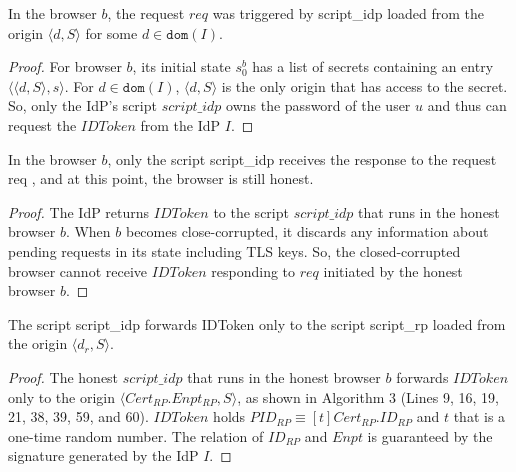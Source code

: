 \begin{lemma}
In the browser $b$, the request $req$ was triggered by script\_idp loaded from the origin $\langle d, S \rangle$ for some $d \in \mathtt{dom}(I)$.
\end{lemma}

\begin{proof}
For browser $b$, its initial state $s^b_0$ has a list of secrets containing an entry $\langle \langle d, S \rangle, s \rangle$. For $d \in \mathtt{dom}(I)$, $\langle d, S \rangle$ is the only origin that has access to the secret. So, only the IdP's script $script\_idp$ owns the password of the user $u$ and thus can request the $IDToken$ from the IdP $I$.
\end{proof}

\begin{lemma}
In the browser $b$, only the script script\_idp receives the response to the request req , and at this point, the browser is still honest.
\end{lemma}

\begin{proof}
The IdP returns $IDToken$ to the script $script\_idp$ that runs in the honest browser $b$. When $b$ becomes close-corrupted, it discards any information about pending requests in its state including TLS keys. So, the closed-corrupted browser cannot receive $IDToken$ responding to $req$ initiated by the honest browser $b$.
\end{proof}

\begin{lemma}
The script script\_idp forwards IDToken only to the script script\_rp loaded from the origin $\langle d_r, S \rangle$.
\end{lemma}

\begin{proof}
The honest $script\_idp$ that runs in the honest browser $b$ forwards $IDToken$ only to the origin $\langle Cert_{RP}.Enpt_{RP}, S \rangle$, as shown in Algorithm 3%
(Lines 9, 16, 19, 21, 38, 39, 59, and 60). 
$IDToken$ holds $PID_{RP} \equiv [t]Cert_{RP}.ID_{RP}$ and $t$ that is a one-time random number. The relation of $ID_{RP}$ and $Enpt$ is guaranteed by the signature generated by the IdP $I$. 
\end{proof}


